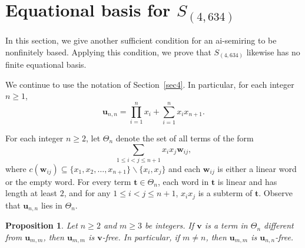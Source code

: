 \documentclass[reqno]{amsart}
\theoremstyle{plain}
\newtheorem{pro}[thm]{Proposition}
\theoremstyle{definition}
\newcommand{\bt}{\mathbf{t}}
\newcommand{\bu}{\mathbf{u}}
\newcommand{\bv}{\mathbf{v}}
\newcommand{\bw}{\mathbf{w}}
\begin{document}
\section{Equational basis for $S_{(4, 634)}$}\label{sec5}
In this section, we give another sufficient condition for an ai-semiring to be nonfinitely based.
Applying this condition, we prove that $S_{(4, 634)}$ likewise has no finite equational basis.

We continue to use the notation of Section~\ref{sec4}.
In particular, for each integer $n \geq 1$,
\[
\mathbf{u}_{n,n}=\prod_{i=1}^n x_i+\sum_{i=1}^n x_ix_{n+1}.
\]

For each integer $n\geq 2$, let $\Theta_n$ denote the set of all terms of the form
\[
\sum_{1\leq i<j\leq n+1}x_ix_j\bw_{ij},
\]
where $c(\bw_{ij})\subseteq\{x_1, x_2,\dots,x_{n+1}\}\backslash\{x_i, x_j\}$
and each $\bw_{ij}$ is either a linear word or the empty word.
For every term $\bt\in\Theta_n$, each word in $\bt$ is linear and has length at least $2$,
and for any $1\leq i<j\leq n+1$, $x_ix_j$ is a subterm of $\bt$.
Observe that $\bu_{n, n}$ lies in $\Theta_n$.

\begin{pro}\label{pro26012502}
Let $n\geq 2$ and $m\geq 3$ be integers.
If $\bv$ is a term in $\Theta_n$ different from $\bu_{m, m}$, then $\bu_{m,m}$ is $\bv$-free.
In particular, if $m\neq n$, then $\bu_{m,m}$ is $\bu_{n, n}$-free.
\end{pro}
\end{document}
